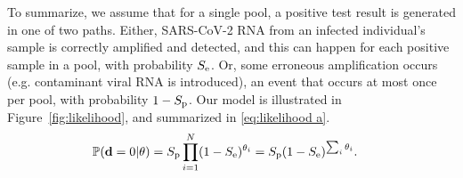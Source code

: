 \documentclass{article}
\begin{document}
To summarize, we assume that for a single pool, a positive test result
is generated in one of two paths. Either, SARS-CoV-2 RNA from an
infected individual's sample is correctly amplified and detected, and
this can happen for each positive sample in a pool, with probability
$S_\text{e}$. Or, some erroneous amplification occurs (e.g. contaminant viral
RNA is introduced), an event that occurs at most once per pool, with
probability $1-S_\text{p}$. Our model is illustrated in
Figure~\ref{fig:likelihood}, and summarized in
\eqref{eq:likelihood a}.%
\begin{align}%
    \Pr(\data=0 | \theta) &= \spec\prod_{i=1}^N
    (1-\sens)^{\theta_i} = \spec(1-\Se)^{\sum_i\theta_i}. \label{eq:likelihood a}
\end{align}

\end{document}
